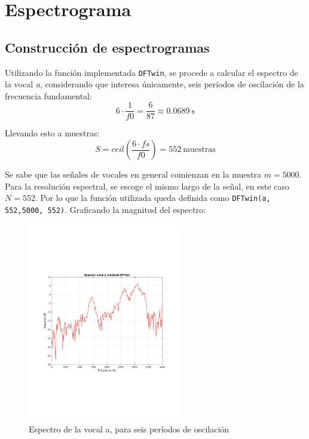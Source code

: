 \section{Espectrograma}
	\subsection{Construcción de espectrogramas}
	Utilizando la función implementada \texttt{DFTwin}, se procede a calcular el espectro de la vocal \textit{a}, considerando que interesa únicamente, seis períodos de oscilación de la frecuencia fundamental:
	\begin{equation*}
		6 \cdot \frac{1}{f0} = \frac{6}{87} \approx 0.0689~\text{s}
	\end{equation*}
	
	Llevando esto a muestras:
	\begin{equation*}
		S = ceil \left( \frac{6 \cdot fs}{f0} \right) = 552~\text{muestras}
	\end{equation*}
	
	Se sabe que las señales de vocales en general comienzan en la muestra $m = 5000$. Para la resolución espectral, se escoge el mismo largo de la señal, en este caso $N = 552$. Por lo que la función utilizada queda definida como \texttt{DFTwin(a, 552,5000, 552)}. Graficando la magnitud del espectro:
	
	\begin{figure}[H]
		\center
		\includegraphics[width=0.6\textwidth,clip, trim = {1.9cm 6.8cm 2.3cm 7cm}]{../plots/a_dftwin.pdf}
		\caption{Espectro de la vocal a, para seis períodos de oscilación}
		\label{fig:fft_6_f0}
	\end{figure}
